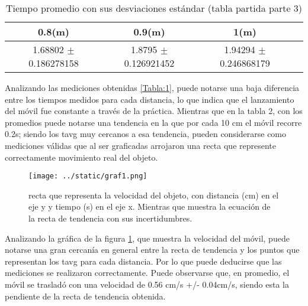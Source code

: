 \documentclass{article}
\begin{document}
		\begin{table}[H]
		\centering
		\begin{tabular}{|c|c|c|c|}
			\hline
				0.8(m) & 0.9(m) & 1(m) \\
			\hline
			 1.68802 $\pm$ 0.186278158 & 1.8795 $\pm$ 0.126921452 & 1.94294 $\pm$ 0.246868179 \\
			\hline
		\end{tabular}
		\caption{ Tiempo promedio con sus desviaciones estándar (tabla partida parte 3)}
		\label{Tabla:2}
	\end{table}

	Analizando las mediciones obtenidas \ref{Tabla:1}, puede notarse una baja diferencia entre los tiempos medidos para cada distancia, lo que indica que el lanzamiento del móvil fue constante a través de la práctica. Mientras que en la tabla 2, con los promedios puede notarse una tendencia en la que por cada 10 cm el móvil recorre 0.2s; siendo los tavg muy cercanos a esa tendencia, pueden considerarse como mediciones válidas que al ser graficadas arrojaron una recta que represente correctamente movimiento real del objeto.

	\begin{figure}[H]
	\centering
	\texttt{[image: ../static/graf1.png]}
	\caption{recta que representa la velocidad del objeto, con distancia (cm) en el eje y y tiempo (s) en el eje x. Mientras que muestra la ecuación de la recta de tendencia con sus incertidumbres.}
	\label{fig:2}
\end{figure}

Analizando la gráfica de la figura \ref{fig:2}, que muestra la velocidad del móvil, puede notarse una gran cercanía en general entre la recta de tendencia y  los puntos que representan los tavg para cada distancia. Por lo que puede deducirse que las mediciones se realizaron correctamente. Puede observarse que, en promedio, el móvil se trasladó con una velocidad de 0.56 cm/s +/- 0.04cm/s, siendo esta la pendiente de la recta de tendencia obtenida.


	





\end{document}

